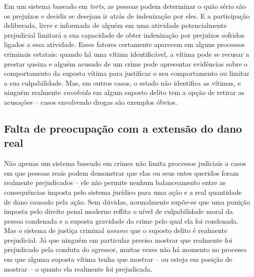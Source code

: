 Em um sistema baseado em \emph{torts}, as pessoas podem determinar o quão sério são os prejuízos e decidir se desejam ir atrás de indenização por eles. E a participação deliberada, livre e informada de alguém em uma atividade potencialmente prejudicial limitará a sua capacidade de obter indenização por prejuízos sofridos ligados a essa atividade. Esses fatores certamente aparecem em alguns processos criminais estatais: quando há uma vítima identificável, a vítima pode se recusar a prestar queixa e alguém acusado de um crime pode apresentar evidências sobre o comportamento da suposta vítima para justificar o seu comportamento ou limitar a sua culpabilidade. Mas, em outros casos, o estado não identifica as vítimas, e ninguém realmente \emph{envolvido} em algum suposto delito tem a opção de retirar as acusações -- casos envolvendo drogas são exemplos óbvios.

\subsection*{Falta de preocupação com a extensão do dano real}

Não apenas um sistema baseado em crimes não limita processos judiciais a casos em que pessoas reais podem demonstrar que elas ou seus entes queridos foram realmente prejudicados -- ele não permite nenhum balanceamento entre as consequências imposta pelo sistema jurídico para uma ação e a real quantidade de dano causado pela ação. Sem dúvidas, normalmente supõe-se que uma punição imposta pelo direito penal moderno reflita o nível de culpabilidade moral da pessoa condenada e a suposta gravidade do crime pelo qual ela foi condenada. Mas o sistema de justiça criminal \emph{assume} que o suposto delito é realmente prejudicial. Já que ninguém em particular precisa mostrar que realmente foi prejudicado pela conduta do agressor, muitas vezes não há momento no processo em que alguma suposta vítima tenha que mostrar -- ou esteja em posição de mostrar -- o quanto ela realmente foi prejudicada.

